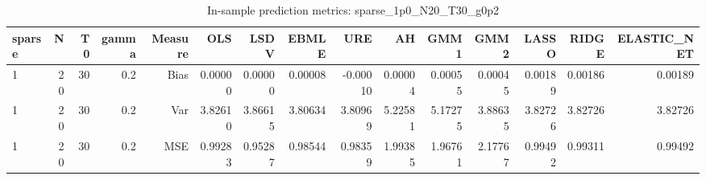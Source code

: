 \begin{table}[!htbp]\centering
\caption{In-sample prediction metrics: sparse_1p0_N20_T30_g0p2}
\label{tab:table2_sparse_1p0_N20_T30_g0p2}
\begin{tabular}{lrrrrrrrrrrrrrr}
\hline
sparse & N & T0 & gamma & Measure & OLS & LSDV & EBMLE & URE & AH & GMM1 & GMM2 & LASSO & RIDGE & ELASTIC_NET \\
\hline
1 & 20 & 30 & 0.2 & Bias & 0.00000 & 0.00000 & 0.00008 & -0.00010 & 0.00004 & 0.00055 & 0.00045 & 0.00189 & 0.00186 & 0.00189 \\
1 & 20 & 30 & 0.2 & Var & 3.82610 & 3.86615 & 3.80634 & 3.80969 & 5.22581 & 5.17275 & 3.88635 & 3.82726 & 3.82726 & 3.82726 \\
1 & 20 & 30 & 0.2 & MSE & 0.99283 & 0.95287 & 0.98544 & 0.98359 & 1.99385 & 1.96761 & 2.17767 & 0.99492 & 0.99311 & 0.99492 \\
\hline
\end{tabular}
\end{table}

